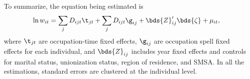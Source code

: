 \documentclass[12pt]{article}
\newcommand{\CiteReference}{../reference.bib}
\theoremstyle{definition}
\begin{document}
To summarize, the equation being estimated is
\begin{equation}
    \label{5}
    \ln w_{it} = \sum_{j} D_{ijt} \t_{jt} + \sum_{j} D_{ijt} \g_{ij} + \bds{Z}_{ij}^{\prime} \bds{\zeta} + \mu_{it},
\end{equation}
where $\t_{jt}$ are occupation-time fixed effects, $\g_{ij}$ are occupation spell fixed effects for each individual, and $\bds{Z}_{ij}$ includes year fixed effects and controls for marital status, unionization status, region of residence, and SMSA. In all the estimations, standard errors are clustered at the individual level.






\end{document}
